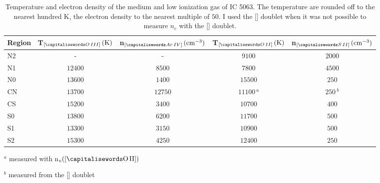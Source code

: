 \documentclass[../thesis.tex]{subfiles}
\begin{document}
\begin{table}
\caption[]{Temperature and electron density of the medium and low ionization gas of IC 5063. 
The temperature are rounded off to the nearest hundred K, the electron density to the nearest multiple of $50$. 
I used the [] doublet when it was not possible to measure $n_e$ with the [] doublet. }
\label{tab:ted_ic}
\centering
\begin{threeparttable}
\begin{tabular}{lcccc}
\hline
Region&T$_{[\ion{O}{III}]}\,(\si{K})$&n$_{[\ion{Ar}{IV}]}\,(\si{cm^{-3}})$&T$_{[\ion{O}{II}]}\,(\si{K})$&n$_{[\ion{S}{II}]}\,(\si{cm^{-3}})$\\
\hline
N2&-&-&$9100$&$2000$\\
N1&$12400$&$8500$&$7800$&$4500$\\
N0&$13600$&$1400$&$15500$&$250$\\
CN&$13700$&$12750$&$11100\,^a$&$250\,^b$\\
CS&$15200$&$3400$&$10700$&$400$\\
S0&$13800$&$6200$&$11700$&$500$\\
S1&$13300$&$3150$&$10900$&$500$\\
S2&$15300$&$4250$&$12400$&$250$\\
\hline
\end{tabular}
\begin{tablenotes}
\item $^a$ measured with n$_e([\rm \ion{O}{II}])$
\item $^b$ measured from the [] doublet
\end{tablenotes}
\end{threeparttable}
\end{table}
\end{document}

